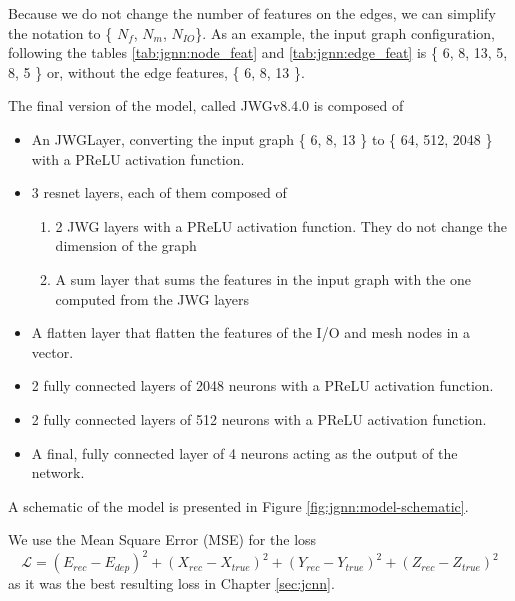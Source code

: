 \documentclass[../main.tex]{subfiles}
\begin{document}
Because we do not change the number of features on the edges, we can simplify the notation to \{{\color{red} $N_{f}$}, {\color{Dandelion} $N_{m}$}, {\color{blue} $N_{IO}$}\}. As an example, the input graph configuration, following the tables \ref{tab:jgnn:node_feat} and \ref{tab:jgnn:edge_feat} is \{{\color{red} 6}, {\color{Dandelion} 8}, {\color{blue} 13}, 5, 8, 5 \} or, without the edge features, \{{\color{red} 6}, {\color{Dandelion} 8}, {\color{blue} 13} \}.

The final version of the model, called JWGv8.4.0 is composed of
\begin{itemize}
  \item An JWGLayer, converting the input graph \{{\color{red} 6}, {\color{Dandelion} 8}, {\color{blue} 13} \} to \{ 64, 512, 2048 \} with a PReLU activation function.
  \item 3 resnet layers, each of them composed of
    \begin{enumerate}
      \item 2 JWG layers with a PReLU activation function. They do not change the dimension of the graph
      \item A sum layer that sums the features in the input graph with the one computed from the JWG layers
    \end{enumerate}
  \item A flatten layer that flatten the features of the I/O and mesh nodes in a vector.
  \item 2 fully connected layers of 2048 neurons with a PReLU activation function.
  \item 2 fully connected layers of 512 neurons with a PReLU activation function.
  \item A final, fully connected layer of 4 neurons acting as the output of the network.
\end{itemize}
A schematic of the model is presented in Figure \ref{fig:jgnn:model-schematic}.

We use the Mean Square Error (MSE) for the loss
\begin{equation}
  \mathcal{L} = (E_{rec} - E_{dep})^2 + (X_{rec} - X_{true})^2 + (Y_{rec} - Y_{true})^2 + (Z_{rec} - Z_{true})^2
\end{equation}
as it was the best resulting loss in Chapter \ref{sec:jcnn}.
\end{document}
